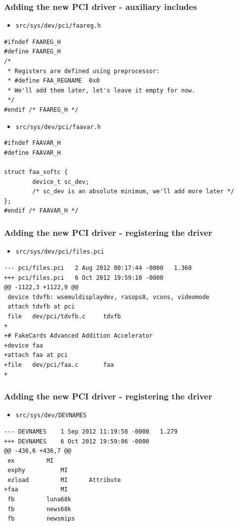 \documentclass[dvipsnames,table]{beamer}
\begin{document}
\begin{frame}[fragile]
\frametitle{Adding the new PCI driver - auxiliary includes}
\scriptsize
\begin{itemize}
	\item {\tt src/sys/dev/pci/faareg.h}
\end{itemize}
\begin{verbatim}
#ifndef FAAREG_H
#define FAAREG_H
/* 
 * Registers are defined using preprocessor:
 * #define FAA_REGNAME	0x0
 * We'll add them later, let's leave it empty for now.
 */
#endif /* FAAREG_H */
\end{verbatim}
\begin{itemize}
	\item {\tt src/sys/dev/pci/faavar.h}
\end{itemize}
\begin{verbatim}
#ifndef FAAVAR_H
#define FAAVAR_H

struct faa_softc {
        device_t sc_dev;
		/* sc_dev is an absolute minimum, we'll add more later */
};
#endif /* FAAVAR_H */
\end{verbatim}
\end{frame}


\begin{frame}[fragile]
\frametitle{Adding the new PCI driver - registering the driver}
\scriptsize
\begin{itemize}
	\item {\tt src/sys/dev/pci/files.pci}
\end{itemize}
\begin{verbatim}
--- pci/files.pci	2 Aug 2012 00:17:44 -0000	1.360
+++ pci/files.pci	6 Oct 2012 19:59:10 -0000
@@ -1122,3 +1122,9 @@
 device	tdvfb: wsemuldisplaydev, rasops8, vcons, videomode
 attach	tdvfb at pci
 file	dev/pci/tdvfb.c		tdvfb	
+
+# FakeCards Advanced Addition Accelerator
+device	faa
+attach	faa at pci
+file	dev/pci/faa.c		faa	
+
\end{verbatim}
\end{frame}

\begin{frame}[fragile]
\frametitle{Adding the new PCI driver - registering the driver}
\scriptsize
\begin{itemize}
	\item {\tt src/sys/dev/DEVNAMES}
\end{itemize}
\begin{verbatim}
--- DEVNAMES	1 Sep 2012 11:19:58 -0000	1.279
+++ DEVNAMES	6 Oct 2012 19:59:06 -0000
@@ -436,6 +436,7 @@
 ex			MI
 exphy			MI
 ezload			MI		Attribute
+faa			MI
 fb			luna68k
 fb			news68k
 fb			newsmips
\end{verbatim}
\end{frame}
\end{document}
